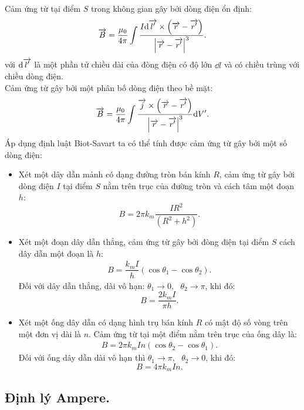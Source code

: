 \begin{appendices}
\begin{center}
\begin{tikzpicture}[x=0.75pt,y=0.75pt,yscale=-1,xscale=1]
\end{tikzpicture}

\end{center}
Cảm ứng từ tại điểm $S$ trong không gian gây bởi dòng điện ổn định:
    $$\ot{B}=\dfrac{\mu_0}{4\pi}\int\dfrac{I\dd \ot{ l'}\times\left(\ot{r}-\ot{r'}\right)}{\left|\ot{r}-\ot{r'}\right|^3}.$$
    với $\dd \ot{ l'}$ là một phần tử chiều dài của đòng điện có độ lớn $\dd l$ và có chiều trùng với chiều dòng điện.\\
    Cảm ứng từ gây bởi một phân bố dòng điện theo bề mặt:
    $$\ot{B}=\dfrac{\mu_0}{4\pi}\int\dfrac{\ot{j}\times\left(\ot{r}-\ot{r'}\right)}{\left|\ot{r}-\ot{r'}\right|^3}\dd V'.$$
    Áp dụng định luật Biot-Savart ta có thể tính được cảm ứng từ gây bởi một số dòng điện:
    \begin{itemize}
        \item Xét một dây dẫn mảnh có dạng đường tròn bán kính $R$, cảm ứng từ gây bởi dòng điện $I$ tại điểm $S$ nằm trên trục của đường tròn và cách tâm một đoạn $h$:
        $$B=2\pi k_m\dfrac{IR^2}{\left(R^2+h^2\right)}.$$
        \item Xét một đoạn dây dẫn thẳng, cảm ứng từ gây bởi đòng điện tại điểm $S$ cách dây dẫn một đoạn là $h$:
        \begin{align*}
        B=\dfrac{k_mI}{ h}\left(\cos{\theta_1}-\cos{\theta_2}\right).
        \end{align*}
        Đối với dây dẫn thẳng, dài vô hạn: $\theta_1\rightarrow 0,\text{ } \theta_2\rightarrow \pi$, khi đó:
        \[B=\dfrac{2 k_mI}{\pi h}.\]
        \item Xét một ống dây dẫn có dạng hình trụ bán kính $R$ có mật độ số vòng trên một đơn vị dài là $n$. Cảm ứng từ tại một điểm nằm trên trục của ống dây là:
        \begin{align*}
            B=2\pi k_mIn\left(\cos{\theta_2}-\cos{\theta_1}\right).
        \end{align*}
        Đối với ống dây dẫn dài vô hạn thì $\theta_1\rightarrow \pi,\text{ } \theta_2\rightarrow 0$, khi đó:
        \[ B=4\pi k_mIn.\]
    \end{itemize}
\subsection{Định lý Ampere.}

\end{appendices}
